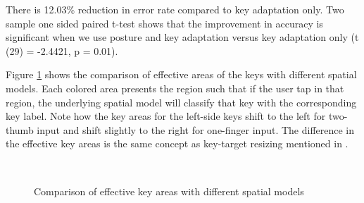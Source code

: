 \documentclass{sigchi}
\begin{document}
There is 12.03\% reduction in error rate compared to key adaptation only. Two
sample one sided paired t-test shows that the improvement in accuracy is
significant when we use posture and key adaptation versus key adaptation only (t (29) = -2.4421, p = 0.01).

Figure \ref{fig:key-boundary} shows the comparison of effective areas of the keys
with different spatial models. Each colored area presents the region such that if the
user tap in that region, the underlying spatial model will classify that key with the 
corresponding key label. Note how the key areas for the left-side keys shift to the left
for two-thumb input and shift slightly to the right for one-finger input. The difference in 
the effective key areas is the same concept as key-target resizing mentioned in \cite{Rudchenko:2011, Gunawardana:2010}.

\begin{figure}[tb]
	\centering
	 ~
	\caption{Comparison of effective key areas with different spatial models}
	\label{fig:key-boundary}
\end{figure}
\end{document}
